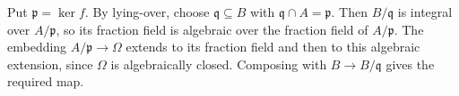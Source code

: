 Put $\mathfrak{p}=\ker f$. By lying-over, choose $\mathfrak{q}\subseteq B$ with $\mathfrak{q}\cap A=\mathfrak{p}$. Then $B/\mathfrak{q}$ is integral over $A/\mathfrak{p}$, so its fraction field is algebraic over the fraction field of $A/\mathfrak{p}$. The embedding $A/\mathfrak{p}\to\Omega$ extends to its fraction field and then to this algebraic extension, since $\Omega$ is algebraically closed. Composing with $B\to B/\mathfrak{q}$ gives the required map.
